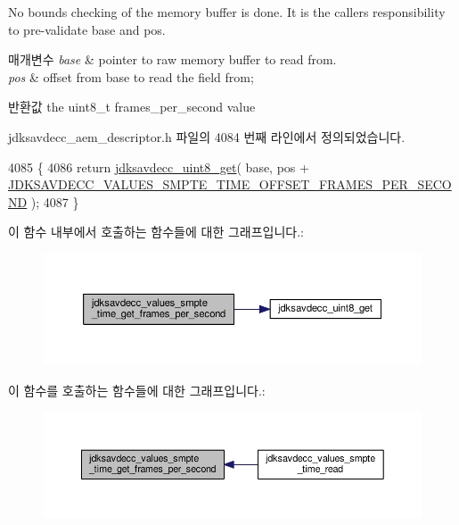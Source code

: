 No bounds checking of the memory buffer is done. It is the caller\textquotesingle{}s responsibility to pre-\/validate base and pos.


\begin{DoxyParams}{매개변수}
{\em base} & pointer to raw memory buffer to read from. \\
\hline
{\em pos} & offset from base to read the field from; \\
\hline
\end{DoxyParams}
\begin{DoxyReturn}{반환값}
the uint8\+\_\+t frames\+\_\+per\+\_\+second value 
\end{DoxyReturn}


jdksavdecc\+\_\+aem\+\_\+descriptor.\+h 파일의 4084 번째 라인에서 정의되었습니다.


\begin{DoxyCode}
4085 \{
4086     \textcolor{keywordflow}{return} \hyperlink{group__endian_ga27091e0bf32429d162f641a3f4bc933f}{jdksavdecc\_uint8\_get}( base, pos + 
      \hyperlink{group__values__smpte__time_ga140c695426360646f03f39624b1881bc}{JDKSAVDECC\_VALUES\_SMPTE\_TIME\_OFFSET\_FRAMES\_PER\_SECOND} 
      );
4087 \}
\end{DoxyCode}


이 함수 내부에서 호출하는 함수들에 대한 그래프입니다.\+:
\nopagebreak
\begin{figure}[H]
\begin{center}
\leavevmode
\includegraphics[width=350pt]{group__values__smpte__time_ga551e3edf0737b4d69f05211661c2532c_cgraph}
\end{center}
\end{figure}




이 함수를 호출하는 함수들에 대한 그래프입니다.\+:
\nopagebreak
\begin{figure}[H]
\begin{center}
\leavevmode
\includegraphics[width=350pt]{group__values__smpte__time_ga551e3edf0737b4d69f05211661c2532c_icgraph}
\end{center}
\end{figure}


